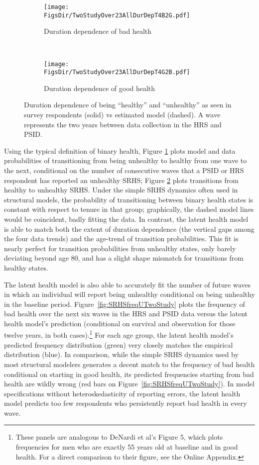 \documentclass[12pt,pdftex,letterpaper]{article}
\newcommand{\RootDir}{..}
\newcommand{\FigsDir}{\RootDir/Figures}
\begin{document}
\begin{figure}
	\centering
	\begin{subfigure}[b]{0.48\textwidth}
		\texttt{[image: \\FigsDir/TwoStudyOver23AllDurDepT4B2G.pdf]}
		\caption{Duration dependence of bad health}\label{fig:DurDepTwoStudyAllB2G}
	\end{subfigure}
	~
	\begin{subfigure}[b]{0.48\textwidth}
		\texttt{[image: \\FigsDir/TwoStudyOver23AllDurDepT4G2B.pdf]}
		\caption{Duration dependence of good health}\label{fig:DurDepTwoStudyAllG2B}
	\end{subfigure}
	\caption{Duration dependence of being ``healthy'' and ``unhealthy'' as seen in survey respondents (solid) vs estimated model (dashed).  A wave represents the two years between data collection in the HRS and PSID.}\label{fig:DurDepTwoStudyAll}
\end{figure}

Using the typical definition of binary health, Figure \ref{fig:DurDepTwoStudyAllB2G} plots model and data probabilities of transitioning from being unhealthy to healthy from one wave to the next, conditional on the number of consecutive waves that a PSID or HRS respondent has reported an unhealthy SRHS; Figure \ref{fig:DurDepTwoStudyAllG2B} plots transitions from healthy to unhealthy SRHS.  Under the simple SRHS dynamics often used in structural models, the probability of transitioning between binary health states is constant with respect to tenure in that group; graphically, the dashed model lines would be coincident, badly fitting the data. In contrast, the latent health model is able to match both the extent of duration dependence (the vertical gaps among the four data trends) and the age-trend of transition probabilities. This fit is nearly perfect for transition probabilities from unhealthy states, only barely deviating beyond age 80, and has a slight shape mismatch for transitions from healthy states.

The latent health model is also able to accurately fit the number of future waves in which an individual will report being unhealthy conditional on being unhealthy in the baseline period. Figure~\ref{fig:SRHSfreqUTwoStudy} plots the frequency of bad health over the next six waves in the HRS and PSID data versus the latent health model's prediction (conditional on survival and observation for those twelve years, in both cases).\footnote{These panels are analogous to DeNardi et al's Figure 5, which plots frequencies for men who are exactly 55 years old at baseline and in good health. For a direct comparison to their figure, see the Online Appendix.} For each age group, the latent health model's predicted frequency distribution (green) very closely matches the empirical distribution (blue). In comparison, while the simple SRHS dynamics used by most structural modelers generates a decent match to the frequency of bad health conditional on starting in good health, its predicted frequencies starting from bad health are wildly wrong (red bars on Figure~\ref{fig:SRHSfreqUTwoStudy}). In model specifications without heteroskedasticity of reporting errors, the latent health model predicts too few respondents who persistently report bad health in every wave.
\end{document}
